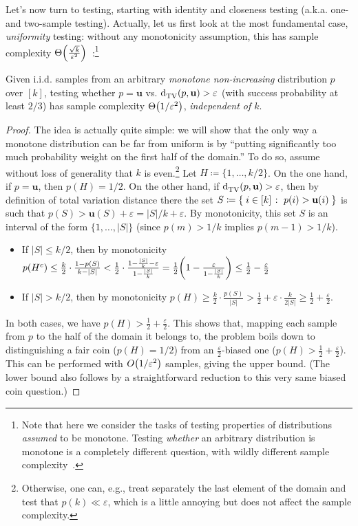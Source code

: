 \documentclass[11pt]{article}
\newcommand{\dst}{\varepsilon}
\newcommand{\ab}{k}
\renewcommand{\eqdef}{\coloneqq}
\newcommand{\p}{p}
\renewcommand{\uniform}{\mathbf{u}}
\begin{document}
Let's now turn to testing, starting with identity and closeness testing (a.k.a. one- and two-sample testing). Actually, let us first look at the most fundamental case, \emph{uniformity} testing: without any monotonicity assumption, this has sample complexity $\bigTheta{\frac{\sqrt{\ab}}{\dst^2}}$~\cite{Paninski:08,VV:17}:\footnote{Note that here we consider the tasks of testing properties of distributions \emph{assumed} to be monotone. Testing \emph{whether} an arbitrary distribution is monotone is a completely different question, with wildly different sample complexity~\cite{BKR:04,Canonne:15,ADK:15,CDGR:18}.}
\begin{theorem}\label{theo:testing:uniformity:monotone}
  Given i.i.d. samples from an arbitrary \emph{monotone non-increasing} distribution $\p$ over $[\ab]$, testing whether $\p=\uniform$ vs. $\totalvardist{\p}{\uniform} > \dst$ (with success probability at least $2/3$) has sample complexity $\bigTheta{1/\dst^2}$, \emph{independent of $\ab$}. 
\end{theorem}
\begin{proof}
  The idea is actually quite simple: we will show that the only way a monotone distribution can be far from uniform is by ``putting significantly too much probability weight on the first half of the domain.'' To do so, assume without loss of generality that $\ab$ is even.\footnote{Otherwise, one can, e.g., treat separately the last element of the domain and test that $\p(\ab) \ll \dst$, which is a little annoying but does not affect the sample complexity.} Let $H\eqdef \{1,\dots,\ab/2\}$. On the one hand, if $\p=\uniform$, then $\p(H) = 1/2$. On the other hand, if $\totalvardist{\p}{\uniform} > \dst$, then by definition of total variation distance there the set $S\eqdef \setOfSuchThat{ i \in [\ab] }{ \p(i) > \uniform(i) }$ is such that $\p(S) > \uniform(S)+\dst = |S|/\ab+\dst$. By monotonicity, this set $S$ is an interval of the form $\{1,\dots,|S|\}$ (since $\p(m) > 1/\ab$ implies $\p(m-1) > 1/\ab$).
\begin{itemize}
  \item If $|S| \leq \ab/2$, then by monotonicity $\p(H^c) \leq \frac{\ab}{2}\cdot \frac{1-\p(S)}{\ab-|S|} < \frac{1}{2}\cdot \frac{1-\frac{|S|}{\ab}-\dst}{1-\frac{|S|}{\ab}}
  = \frac{1}{2} \mleft(1-\frac{\dst}{1-\frac{|S|}{\ab}}\mright) \leq \frac{1}{2} - \frac{\dst}{2}$
  \item If $|S| > \ab/2$, then by monotonicity $\p(H) \geq \frac{\ab}{2}\cdot \frac{\p(S)}{|S|} > \frac{1}{2} + \dst\cdot \frac{\ab}{2|S|} \geq \frac{1}{2} + \frac{\dst}{2}$.
\end{itemize}
In both cases, we have $\p(H) > \frac{1}{2} + \frac{\dst}{2}$. This shows that, mapping each sample from $\p$ to the half of the domain it belongs to, the problem boils down to distinguishing a fair coin ($\p(H) = 1/2$) from an $\frac{\dst}{2}$-biased one ($\p(H) > \frac{1}{2} + \frac{\dst}{2}$). This can be performed with $\bigO{1/\dst^2}$ samples, giving the upper bound. (The lower bound also follows by a straightforward reduction to this very same biased coin question.)
\end{proof}
\end{document}
